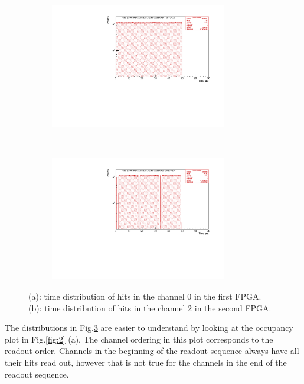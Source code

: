\begin{figure}[!h]
  \begin{subfigure}[b]{\textwidth}
      \centering
      \includegraphics[width=0.85\textwidth]{figures/pdf/figure_00007_timedistr_roc_simulation_ch0_281.pdf}
      \caption{}
      \label{fig:t1}
  \end{subfigure}
\\
  \begin{subfigure}[b]{\textwidth}
      \centering
      \includegraphics[width=0.85\textwidth]{figures/pdf/figure_00003_timedistr_roc_simulation_ch2_281.pdf}
      \caption{}
      \label{fig:t2}
  \end{subfigure}
     \caption{(a): time distribution of hits in the channel 0 in the first FPGA. \\
     (b): time distribution of hits in the channel 2 in the second FPGA.}
     \label{fig:1}
\end{figure}

    

The distributions in Fig.\ref{fig:1} are easier to understand by looking at the occupancy plot in Fig.\ref{fig:2} (a).
The channel ordering in this plot corresponds to the readout order.
Channels in the beginning of the readout sequence always have all their hits read out,
  however that is not true for the channels in the end of the readout sequence.


